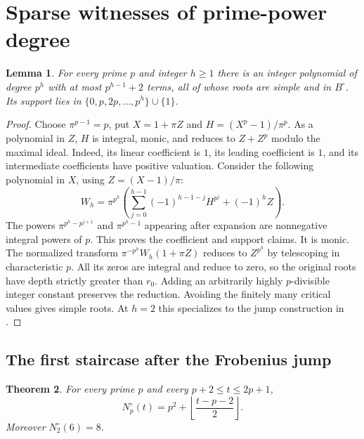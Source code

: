 \documentclass[11pt]{article}
\newtheorem{theorem}{Theorem}\newtheorem{lemma}[theorem]{Lemma}
\begin{document}
\section{Sparse witnesses of prime-power degree}
\begin{lemma}\label{tower}
For every prime $p$ and integer $h\ge1$ there is an integer polynomial of degree $p^h$ with at most $p^{h-1}+2$ terms, all of whose roots are simple and in $B^\circ$. Its support lies in $\{0,p,2p,\ldots,p^h\}\cup\{1\}$.
\end{lemma}
\begin{proof}
Choose $\pi^{p-1}=p$, put $X=1+\pi Z$ and $H=(X^p-1)/\pi^p$. As a polynomial in $Z$, $H$ is integral, monic, and reduces to $Z+Z^p$ modulo the maximal ideal. Indeed, its linear coefficient is $1$, its leading coefficient is $1$, and its intermediate coefficients have positive valuation. Consider the following polynomial in $X$, using $Z=(X-1)/\pi$:
\[
 W_h=\pi^{p^h}\left(\sum_{j=0}^{h-1}(-1)^{h-1-j}H^{p^j}+(-1)^h Z\right).
\]
The powers $\pi^{p^h-p^{j+1}}$ and $\pi^{p^h-1}$ appearing after expansion are nonnegative integral powers of $p$. This proves the coefficient and support claims. It is monic. The normalized transform $\pi^{-p^h}W_h(1+\pi Z)$ reduces to $Z^{p^h}$ by telescoping in characteristic $p$. All its zeros are integral and reduce to zero, so the original roots have depth strictly greater than $r_0$. Adding an arbitrarily highly $p$-divisible integer constant preserves the reduction. Avoiding the finitely many critical values gives simple roots. At $h=2$ this specializes to the jump construction in \cite{repo}.
\end{proof}

\subsection{The first staircase after the Frobenius jump}

\begin{theorem}\label{staircase}
For every prime $p$ and every $p+2\le t\le2p+1$,
\[
 N_p^\circ(t)=p^2+\left\lfloor\frac{t-p-2}{2}\right\rfloor .
\]
Moreover $N_2^\circ(6)=8$.
\end{theorem}
\end{document}
